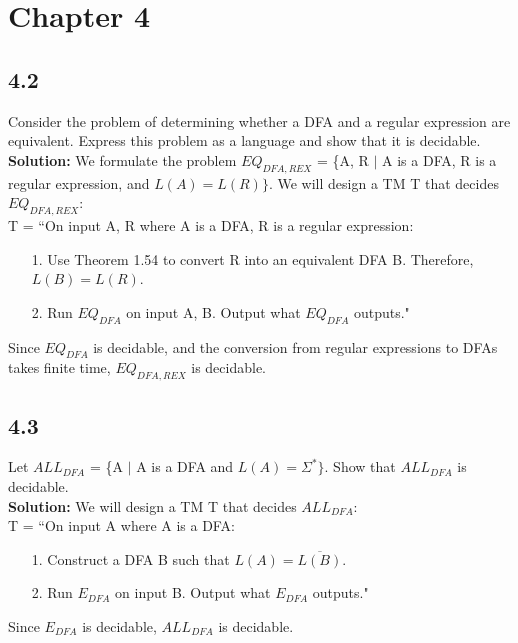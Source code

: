 \section{Chapter 4}
\subsection*{4.2} Consider the problem of determining whether a DFA and a regular expression are equivalent. Express this problem as a language and show that it is decidable.
\\
\textbf{Solution:} We formulate the problem $EQ_{DFA,REX}$ = \{\textlangle{}A, R\textrangle{} $|$ A is a DFA, R is a regular expression, and $L(A) = L(R)\}$. We will design a TM T that decides $EQ_{DFA,REX}$:
\\
T = ``On input \textlangle{}A, R\textrangle{} where A is a DFA, R is a regular expression:
\begin{enumerate}
\itemsep0em
\item[1.]Use Theorem 1.54 to convert R into an equivalent DFA B. Therefore, $L(B) = L(R)$.
\item[2.]Run $EQ_{DFA}$ on input \textlangle{}A, B\textrangle{}. Output what $EQ_{DFA}$ outputs."
\end{enumerate}
Since $EQ_{DFA}$ is decidable, and the conversion from regular expressions to DFAs takes finite time, $EQ_{DFA,REX}$ is decidable.

\subsection*{4.3} Let $ALL_{DFA}$ = \{\textlangle{}A\textrangle{} $|$ A is a DFA and $L(A) = \Sigma^*\}$. Show that $ALL_{DFA}$ is decidable.
\\
\textbf{Solution:} We will design a TM T that decides $ALL_{DFA}$:
\\
T = ``On input \textlangle{}A\textrangle{} where A is a DFA:
\begin{enumerate}
\itemsep0em
\item[1.]Construct a DFA B such that $L(A) = \overline{L(B)}$.
\item[2.]Run $E_{DFA}$ on input \textlangle{}B\textrangle{}. Output what $E_{DFA}$ outputs."
\end{enumerate}
Since $E_{DFA}$ is decidable, $ALL_{DFA}$ is decidable.